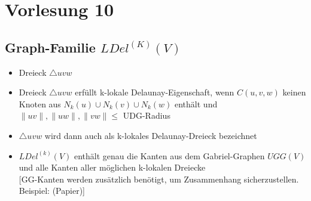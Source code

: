 \documentclass{article}
\begin{document}
\section{Vorlesung 10}
\subsection*{Graph-Familie $LDel^{(K)}(V)$}
\begin{itemize}
	\item Dreieck $\triangle uvw$
	\item Dreieck $\triangle uvw$ erfüllt k-lokale Delaunay-Eigenschaft,
	wenn $C(u,v,w)$ keinen Knoten aus $N_k(u) \cup N_k(v) \cup N_k(w)$
	enthält und $\|uv\|, \|uw\|, \|vw\| \leq$ UDG-Radius
	\item $\triangle uvw$ wird dann auch als k-lokales Delaunay-Dreieck
	bezeichnet
	\item $LDel^{(k)}(V)$ enthält genau die Kanten aus dem Gabriel-Graphen
	$UGG(V)$ und alle Kanten aller möglichen k-lokalen Dreiecke \\
	{[}GG-Kanten werden zusätzlich benötigt, um Zusammenhang
	sicherzustellen. Beispiel: (Papier)]
\end{itemize}
\end{document}
